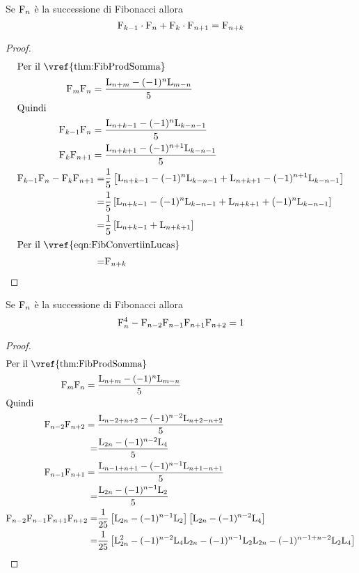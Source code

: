 \begin{thm}\label{thm:FibHonsberger}
	Se $\mathrm{F}_{n}$ è la successione di Fibonacci allora 
	\begin{equation}
		\mathrm{F}_{k-1}\cdot\mathrm{F}_{n}+\mathrm{F}_{k}\cdot\mathrm{F}_{n+1}=\mathrm{F}_{n+k}
	\end{equation}\label{eqn:FibHonsberger}
\end{thm}
\begin{proof}
	\begin{align*}
		\intertext{Per il~\vref{thm:FibProdSomma}}
	\Fib{m}\Fib{n}={}&\dfrac{\Luc{n+m}-(-1)^n\Luc{m-n}}{5}\\
	\intertext{Quindi}
	\Fib{k-1}\Fib{n}={}&\dfrac{\Luc{n+k-1}-(-1)^n\Luc{k-n-1}}{5}\\
	\Fib{k}\Fib{n+1}={}&\dfrac{\Luc{n+k+1}-(-1)^{n+1}\Luc{k-n-1}}{5}\\
	\Fib{k-1}\Fib{n}-\Fib{k}\Fib{n+1}=
	&\dfrac{1}{5}\left[\Luc{n+k-1}-(-1)^n\Luc{k-n-1}+\Luc{n+k+1}-(-1)^{n+1}\Luc{k-n-1}\right]\\
	=&{}\dfrac{1}{5}\left[\Luc{n+k-1}-(-1)^n\Luc{k-n-1}+\Luc{n+k+1}+(-1)^{n}\Luc{k-n-1}\right]\\
	=&{}\dfrac{1}{5}\left[\Luc{n+k-1}+\Luc{n+k+1}\right]\\
	\intertext{Per il~\vref{eqn:FibConvertiinLucas}}
	=&{}\Fib{n+k}
	\end{align*}
\end{proof}
\begin{thm}\label{thm:FibGelinCesaro}
	Se $\mathrm{F}_{n}$ è la successione di Fibonacci allora 
	\begin{equation}
	\mathrm{F}_{n}^4-\mathrm{F}_{n-2}\mathrm{F}_{n-1}\mathrm{F}_{n+1}\mathrm{F}_{n+2}=1
	\end{equation}\label{eqn:FibGelinCesaro}
\end{thm}
\begin{proof}
\begin{align*}
		\intertext{Per il~\vref{thm:FibProdSomma}}
	\Fib{m}\Fib{n}={}&\dfrac{\Luc{n+m}-(-1)^n\Luc{m-n}}{5}\\
	\intertext{Quindi}
	\Fib{n-2}\Fib{n+2}={}&\dfrac{\Luc{n-2+n+2}-(-1)^{n-2}\Luc{n+2-n+2}}{5}\\
	=&\dfrac{\Luc{2n}-(-1)^{n-2}\Luc{4}}{5}\\
	\Fib{n-1}\Fib{n+1}={}&\dfrac{\Luc{n-1+n+1}-(-1)^{n-1}\Luc{n+1-n+1}}{5}\\
	=&\dfrac{\Luc{2n}-(-1)^{n-1}\Luc{2}}{5}\\
	\Fib{n-2}\Fib{n-1}\Fib{n+1}\Fib{n+2}
	=&\dfrac{1}{25}\left[\Luc{2n}-(-1)^{n-1}\Luc{2}\right]\left[\Luc{2n}-(-1)^{n-2}\Luc{4}\right]\\
	=&\dfrac{1}{25}\left[\Luc{2n}^2-(-1)^{n-2}\Luc{4}\Luc{2n}-(-1)^{n-1}\Luc{2}\Luc{2n}-(-1)^{n-1+n-2}\Luc{2}\Luc{4}\right]\\
\end{align*}
\end{proof}

